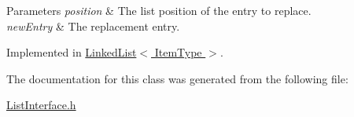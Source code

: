 \begin{DoxyParams}{Parameters}
{\em position} & The list position of the entry to replace. \\
\hline
{\em new\+Entry} & The replacement entry. \\
\hline
\end{DoxyParams}


Implemented in \hyperlink{class_linked_list_a3035f880c50e7d8f68e67c093d4607ca}{Linked\+List$<$ Item\+Type $>$}.



The documentation for this class was generated from the following file\+:\begin{DoxyCompactItemize}
\item 
\hyperlink{_list_interface_8h}{List\+Interface.\+h}\end{DoxyCompactItemize}
